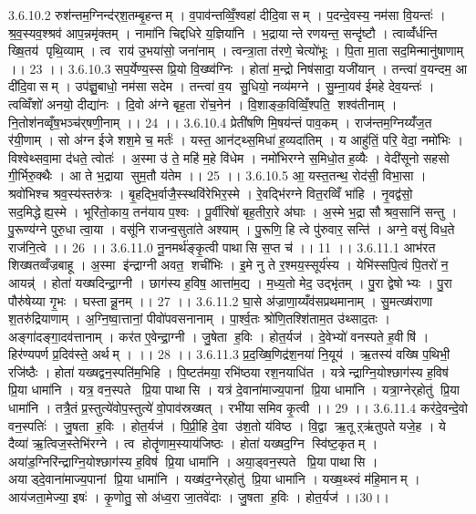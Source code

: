 3.6.10.2
रुश॑न्तम॒ग्निन्द॑र्‌श॒तम्बृ॒हन्तम् । व॒पाव॑न्तव्विँ॒श्वहा॑ दीदि॒वासम् । प॒दन्दे॒वस्य॒ नम॑सा वि॒यन्तः॑ । श्र॒व॒स्यव॒श्श्रव॑ आप॒न्नमृ॑क्तम् । नामा॑नि चिद्दधिरे य॒ज्ञिया॑नि । भ॒द्रायान्ते रणयन्त॒ सन्दृ॑ष्टौ । त्वाव्वँ॑र्धन्ति ख्षि॒तय॑ पृथि॒व्याम् । त्व राय॑ उ॒भया॑सो॒ जना॑नाम् । त्वन्त्रा॒ता त॑रणे॒ चेत्यो॑भूः । पि॒ता मा॒ता सद॒मिन्मानु॑षाणाम् ।। 23 ।।
3.6.10.3
सप॒र्येण्य॒स्स प्रि॒यो वि॒ख्ष्व॑ग्निः । होता॑ म॒न्द्रो निष॑सादा॒ यजी॑यान् । तन्त्वा॑ व॒यन्दम॒ आ दी॑दि॒वासम् । उप॑ज्ञु॒बाधो॒ नम॑सा सदेम । तन्त्वा॑ व॒य सु॒धियो॒ नव्य॑मग्ने । सु॒म्ना॒यव॑ ईमहे देव॒यन्तः॑ । त्वव्विँशो॑ अनयो॒ दीद्या॑नः । दि॒वो अ॑ग्ने बृह॒ता रो॑च॒नेन॑ । वि॒शाङ्क॒विव्विँ॒श्पति॒॒ शश्व॑तीनाम् । नि॒तोश॑नव्वृँष॒भञ्च॑र्‌षणी॒नाम् ।। 24 ।।
3.6.10.4
प्रेती॑षणि मि॒षय॑न्तं पाव॒कम् । राज॑न्तम॒ग्निय्यँ॑ज॒त र॑यी॒णाम् । सो अ॑ग्न ईजे शश॒मे च॒ मर्तः॑ । यस्त॒ आन॑ट्थ्स॒मिधा॑ ह॒व्यदा॑तिम् । य आहु॑तिं॒ परि॒ वेदा॒ नमो॑भिः । विश्वेथ्सवा॒मा द॑धते॒ त्वोतः॑ । अ॒स्मा उ॑ ते॒ महि॑ म॒हे वि॑धेम । नमो॑भिरग्ने स॒मिधो॒त ह॒व्यैः । वेदी॑सूनो सहसो गी॒र्भिरु॒क्थैः । आ ते भ॒द्राया॑ सुम॒तौ य॑तेम ।। 25 ।।
3.6.10.5
आ॒ यस्त॒तन्थ॒ रोद॑सी॒ विभा॒सा । श्रवो॑भिश्च श्रव॒स्य॑स्तरु॑त्रः । बृ॒हद्भि॒र्वाजै॒स्स्थवि॑रेभिर॒स्मे । रे॒वद्भि॑रग्ने वित॒रव्विँ भा॑हि । नृ॒वद्व॑सो॒ सद॒मिद्धेह्य॒स्मे । भूरि॑तो॒काय॒ तन॑याय प॒श्वः । पू॒र्वीरिषो॑ बृह॒तीरा॒रे अ॑घाः । अ॒स्मे भ॒द्रा सौश्रव॒सानि॑ सन्तु । पु॒रूण्य॑ग्ने पुरु॒धा त्वा॒या । वसू॑नि राजन्व॒सुता॑ते अश्याम् । पु॒रूणि॒ हि त्वे पु॑रुवार॒ सन्ति॑ । अग्ने॒ वसु॑ विध॒ते राज॑नि॒त्वे ।। 26 ।।
3.6.11.0
नू॒नमर्थ॑ङ्कृ॒त्वी पाथा॑सि स॒प्त च॑ ।। 11 ।।
3.6.11.1
आभ॑रत शिख्षतव्वँज्रबाहू । अ॒स्मा इ॑न्द्राग्नी अवत॒॒ शची॑भिः । इ॒मे नु ते र॒श्मय॒स्सूर्य॑स्य । येभि॑स्सपि॒त्वं पि॒तरो॑ न॒ आयन्न्॑ । होता॑ यख्षदिन्द्रा॒ग्नी । छाग॑स्य ह॒विष॒ आत्ता॑म॒द्य । म॒ध्य॒तो मेद॒ उद्भृ॑तम् । पु॒रा द्वेषोभ्यः । पु॒रा पौरु॑षेय्या गृ॒भः । घस्तान्नू॒नम् ।। 27 ।।
3.6.11.2
घा॒से अ॑ज्राणा॒य्यँव॑सप्रथमानाम् । सु॒मत्ख्ष॑राणा श॒तरु॑द्रियाणाम् । अ॒ग्नि॒ष्वा॒त्तानां॒ पीवो॑पवसनानाम् । पा॒र्श्व॒तः श्रो॑णि॒तश्शि॑ताम॒त उ॑थ्साद॒तः । अङ्गा॑दङ्गा॒दव॑त्तानाम् । कर॑त ए॒वेन्द्रा॒ग्नी । जु॒षेता॑ ह॒विः । होत॒र्यज॑ । दे॒वेभ्यो॑ वनस्पते ह॒वीषि॑ । हिर॑ण्यपर्ण प्र॒दिव॑स्ते॒ अर्थम् । ।। 28 ।।
3.6.11.3
प्र॒द॒ख्षि॒णिद्र॑श॒नया॑ नि॒यूय॑ । ऋ॒तस्य॑ वख्षि प॒थिभी॒ रजि॑ष्ठैः । होता॑ यख्षद्वन॒स्पति॑म॒भिहि । पि॒ष्टत॑मया॒ रभि॑ष्ठया रश॒नयाधि॑त । यत्रेन्द्राग्नि॒योश्छाग॑स्य ह॒विष॑ प्रि॒या धामा॑नि । यत्र॒ वन॒स्पते प्रि॒या पाथा॑सि । यत्र॑ दे॒वाना॑माज्य॒पानां प्रि॒या धामा॑नि । यत्रा॒ग्नेर्‌होतु॑ प्रि॒या धामा॑नि । तत्रै॒तं प्र॒स्तुत्ये॑वोप॒स्तुत्ये॑ वो॒पाव॑स्रख्षत् । रभी॑यासमिव कृ॒त्वी ।। 29 ।।
3.6.11.4
कर॑दे॒वन्दे॒वो वन॒स्पतिः॑ । जु॒षता॑ ह॒विः । होत॒र्यज॑ । पि॒प्री॒हि दे॒वा उ॑श॒तो य॑विष्ठ । वि॒द्वा ऋ॒तूऱ्ऋ॑तुपते यजे॒ह । ये दैव्या॑ ऋ॒त्विज॒स्तेभि॑रग्ने । त्व होतॄ॑णाम॒स्याय॑जिष्ठः । होता॑ यख्षद॒ग्नि स्वि॑ष्ट॒कृतम् । अया॑ड॒ग्निरि॑न्द्राग्नि॒योश्छाग॑स्य ह॒विष॑ प्रि॒या धामा॑नि । अया॒ड्वन॒स्पते प्रि॒या पाथा॑सि । अयाड्दे॒वाना॑माज्य॒पानां प्रि॒या धामा॑नि । यख्ष॑द॒ग्नेर्‌होतु॑ प्रि॒या धामा॑नि । यख्ष॒थ्स्वं म॑हि॒मानम् । आय॑जता॒मेज्या॒ इषः॑ । कृ॒णोतु॒ सो अ॑ध्व॒रा जा॒तवे॑दाः । जु॒षता॑ ह॒विः । होत॒र्यज॑ ।।30।।
